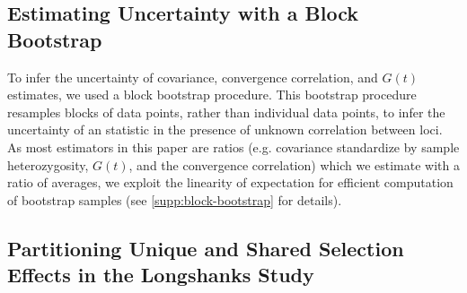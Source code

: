 \documentclass[11pt]{article}
\newcommand{\vb}[1]{{\it \color{blue} #1}}
\DeclareMathOperator{\var}{Var}
\providecommand{\DIFdelbegin}{} %
\begin{document}
\subsection{Estimating Uncertainty with a Block Bootstrap}

To infer the uncertainty of covariance, convergence correlation, and $G(t)$
estimates, we used a block bootstrap procedure. This bootstrap procedure
resamples blocks of data points, rather than individual data points, to infer
the uncertainty of an statistic in the presence of unknown correlation between
loci. As most estimators in this paper are ratios (e.g. covariance standardize
by sample heterozygosity, $G(t)$, and the convergence correlation) which we
estimate with a ratio of averages, we exploit the linearity of expectation for
efficient computation of bootstrap samples (see \ref{supp:block-bootstrap} for
details).

\subsection{Partitioning Unique and Shared Selection Effects in the Longshanks Study}
\label{sec:mm-partition}

\DIFdelbegin %
\end{document}
